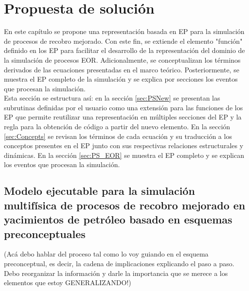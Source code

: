 \chapter{Propuesta de solución}
En este capítulo se propone una representación basada en EP para la simulación de procesos de recobro mejorado. Con este fin, se extiende el elemento "función" definido en los EP para facilitar el desarrollo de la representación del dominio de la simulación de procesos EOR. Adicionalmente, se conceptualizan los términos derivados de las ecuaciones presentadas en el marco teórico. Posteriormente, se muestra el EP completo de la simulación y se explica por secciones los eventos que procesan la simulación.\\

Esta sección se estructura así: en la sección \ref{sec:PSNew} se presentan las subrutinas definidas por el usuario como una extensión para las funciones de los EP que permite reutilizar una representación en múltiples secciones del EP y la regla para la obtención de código a partir del nuevo elemento. En la sección \ref{sec:Concepts} se revisan los términos de cada ecuación y su traducción a los conceptos presentes en el EP junto con sus respectivas relaciones estructurales y dinámicas. En la sección \ref{sec:PS_EOR} se muestra el EP completo y se explican los eventos que procesan la simulación.

\section{Modelo ejecutable para la simulación multifísica de procesos de recobro mejorado en yacimientos de petróleo basado en esquemas preconceptuales}

(Acá debo hablar del proceso tal como lo voy guiando en el esquema preconceptual, es decir, la cadena de implicaciones explicando el paso a paso. Debo reorganizar la información y darle la importancia que se merece a los elementos que estoy GENERALIZANDO!)


